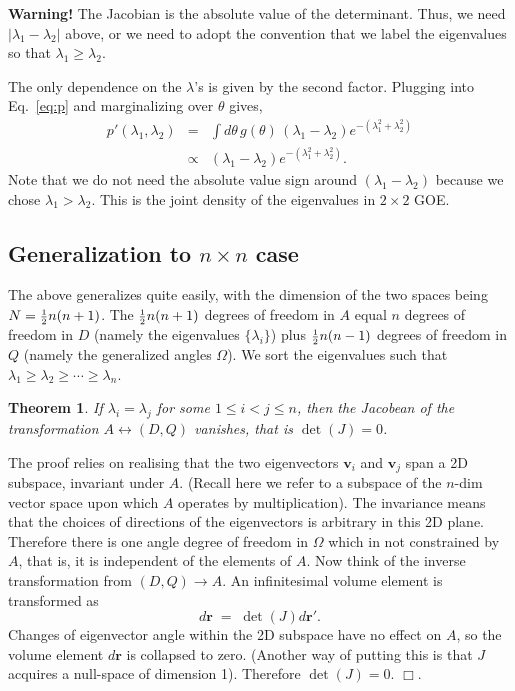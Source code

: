 \documentclass[12pt,letterpaper]{report}
\newcommand\be{\begin{equation}}
\newcommand\ee{\end{equation}}
\newcommand\bea{\begin{eqnarray}}
\newcommand\eea{\end{eqnarray}}
\newcommand{\done}{\Box} %
\newtheorem{thm}{Theorem}[section]
\newcommand{\half}{\mbox{\small $\frac{1}{2}$}}
\newcommand{\mbf}[1]{{\mathbf #1}}
\begin{document}
\textbf{Warning!} The Jacobian is the absolute value of the
determinant. Thus, we need $|\lambda_1 - \lambda_2|$ above, or we
need to adopt the convention that we label the eigenvalues so that
$\lambda_1 \ge \lambda_2$.

The only dependence on the $\lambda$'s is given by the second
factor. Plugging into Eq.~\ref{eq:p} and marginalizing over
$\theta$ gives, \bea \label{eq:p2} p'(\lambda_1,\lambda_2) & =&
\int d\theta\,  g(\theta) \,  (\lambda_1 - \lambda_2)
e^{-(\lambda_1^2 + \lambda_2^2)} \nonumber \\
& \propto & (\lambda_1 - \lambda_2) e^{-(\lambda_1^2 +
\lambda_2^2)}. \eea Note that we do not need the absolute value
sign around $(\lambda_1 - \lambda_2)$ because we chose $\lambda_1
> \lambda_2$. This is the joint density of the eigenvalues in
$2\times 2$ GOE.


\subsection{Generalization to $n\times n$ case}

The above generalizes quite easily, with the dimension of the two
spaces being $N = \half n(n+1)$. The $\half n(n+1) $ degrees of
freedom in $A$ equal $n$ degrees of freedom in $D$ (namely the
eigenvalues $\{\lambda_i\}$) plus $\half n(n-1)$ degrees of
freedom in $Q$ (namely the generalized angles $\Omega$). We sort
the eigenvalues such that $\lambda_1 \ge \lambda_2 \ge \cdots \ge
\lambda_n$.

\begin{thm}
If $\lambda_i = \lambda_j$ for some $1 \le i < j \le n$, then the
Jacobean of the transformation $A \leftrightarrow (D,Q)$ vanishes,
that is $\det(J) = 0$.
\end{thm}

The proof relies on realising that the two eigenvectors
$\mbf{v}_i$ and $\mbf{v}_j$ span a 2D subspace, invariant under
$A$. (Recall here we refer to a subspace of the $n$-dim vector
space upon which $A$ operates by multiplication). The invariance
means that the choices of directions of the eigenvectors is
arbitrary in this 2D plane. Therefore there is one angle degree of
freedom in $\Omega$ which in not constrained by $A$, that is, it
is independent of the elements of $A$. Now think of the inverse
transformation from $(D,Q) \rightarrow A$. An infinitesimal volume
element is transformed as \be
    d\mbf{r} \;=\; \det(J) d\mbf{r}'.
\ee Changes of eigenvector angle within the 2D subspace have no
effect on $A$, so the volume element $d\mbf{r}$ is collapsed to
zero. (Another way of putting this is that $J$ acquires a
null-space of dimension 1). Therefore $\det(J) = 0$. $\done$.
\end{document}
